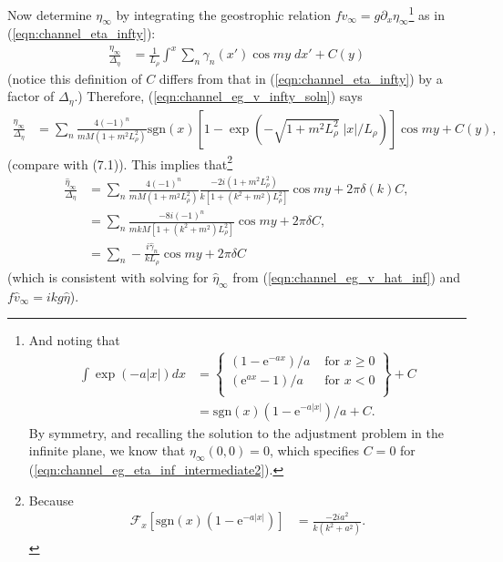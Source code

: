 \documentclass[10pt,reqno]{amsart}
\newcommand{\expe}{{\mathrm e}}
\newcommand{\sign}{\mathrm{sgn}}
\begin{document}
Now determine $\eta_\infty$ by integrating the geostrophic relation $f v_\infty = g \partial_x \eta_\infty$\footnote{And noting that
\begin{align}
\int \exp \left( - a |x| \right) dx 
& = 
\left\{ \begin{array}{lr}
\left( 1 - \expe^{-a x} \right)/a & \text{~for~} x \ge 0 \\
\left( \expe^{a x} -1 \right)/a & \text{~for~} x < 0 \\
\end{array} \right\} + C \\
& = \sign(x) \left( 1 - \expe^{-a |x|} \right)/a + C.
\label{eqn:channel_eg_eta_inf_intermediate2}
\end{align}
By symmetry, and recalling the solution to the adjustment problem in the infinite plane, we know that $\eta_\infty (0,0) = 0$, which specifies $C=0$ for (\ref{eqn:channel_eg_eta_inf_intermediate2}).
} as in (\ref{eqn:channel_eta_infty}):
\begin{align}
\frac{\eta_\infty}{\Delta_\eta} & = \frac{1}{L_\rho} \int^x \sum_n \gamma_n(x') \cos m y \; dx' + C(y) 
\label{eqn:channel_eg_eta_inf_intermediate}
\end{align}
(notice this definition of $C$ differs from that in (\ref{eqn:channel_eta_infty}) by a factor of $\Delta_\eta$.)
Therefore, (\ref{eqn:channel_eg_v_infty_soln}) says
\begin{align}
\frac{\eta_\infty}{\Delta_\eta} & = \sum_n \frac{4 {\left(-1\right)}^{n} }{m M \left( 1 + m^2 L_\rho^2 \right)} \sign(x) \left[ 1 - \exp \left( - \sqrt{ 1 + m^2 L_\rho^2 } \; |x| /L_\rho \right) \right] \cos m y + C(y) , \label{eqn:channel_eg_eta_steady} 
\end{align}
(compare with \citealt{gill76} (7.1)).
This implies that\footnote{Because
\begin{align}
{\mathcal F}_x \left[ \sign(x) \left( 1 - \expe^{ - a |x| } \right) \right] &= 
\frac{-2 i a^2}{k \left(k^2 + a^2\right) } .
\end{align}
}
\begin{align}
\frac{\hat{\eta}_\infty}{\Delta_\eta} & = \sum_n \frac{4 {\left(-1\right)}^{n} }{m M \left( 1 + m^2 L_\rho^2 \right)} \frac{- 2 i \left( 1 + m^2 L_\rho^2 \right)}{ k \left[ 1+ \left( k^2 + m^2  \right) L_\rho^2 \right] } \cos m y + 2 \pi \delta (k) C , \\
& = \sum_n \frac{-8 i {\left(-1\right)}^n}{m k M \left[ 1+ \left( k^2 + m^2  \right) L_\rho^2 \right]} \cos m y + 2 \pi \delta C , \\
& =  \sum_n  -\frac{i \hat{\gamma}_n}{k L_\rho} \cos m y + 2 \pi \delta C
\end{align}
(which is consistent with solving for $\hat{\eta}_\infty$ from (\ref{eqn:channel_eg_v_hat_inf}) and $f \hat{v}_{\infty} = i k g \hat{\eta}$).
\end{document}

